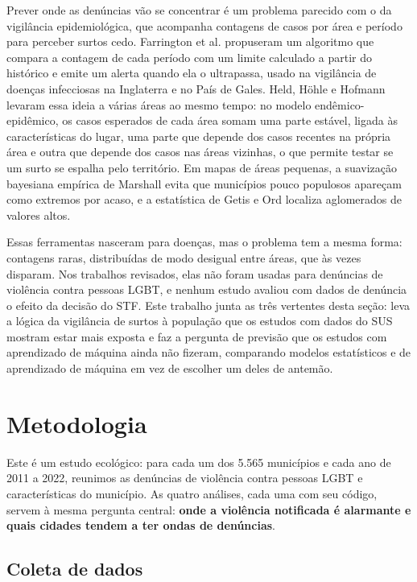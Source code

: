\documentclass[12pt]{article}
\begin{document}
Prever onde as denúncias vão se concentrar é um problema parecido com o da vigilância epidemiológica, que acompanha contagens de casos por área e período para perceber surtos cedo. Farrington et al. \cite{farrington:1996} propuseram um algoritmo que compara a contagem de cada período com um limite calculado a partir do histórico e emite um alerta quando ela o ultrapassa, usado na vigilância de doenças infecciosas na Inglaterra e no País de Gales. Held, Höhle e Hofmann \cite{held_hohle_hofmann:2005} levaram essa ideia a várias áreas ao mesmo tempo: no modelo endêmico-epidêmico, os casos esperados de cada área somam uma parte estável, ligada às características do lugar, uma parte que depende dos casos recentes na própria área e outra que depende dos casos nas áreas vizinhas, o que permite testar se um surto se espalha pelo território. Em mapas de áreas pequenas, a suavização bayesiana empírica de Marshall \cite{marshall:1991} evita que municípios pouco populosos apareçam como extremos por acaso, e a estatística de Getis e Ord \cite{getis_ord:1992} localiza aglomerados de valores altos.

Essas ferramentas nasceram para doenças, mas o problema tem a mesma forma: contagens raras, distribuídas de modo desigual entre áreas, que às vezes disparam. Nos trabalhos revisados, elas não foram usadas para denúncias de violência contra pessoas LGBT, e nenhum estudo avaliou com dados de denúncia o efeito da decisão do STF. Este trabalho junta as três vertentes desta seção: leva a lógica da vigilância de surtos à população que os estudos com dados do SUS mostram estar mais exposta e faz a pergunta de previsão que os estudos com aprendizado de máquina ainda não fizeram, comparando modelos estatísticos e de aprendizado de máquina em vez de escolher um deles de antemão.


\section{Metodologia}
\label{sec:metodologia}

Este é um estudo ecológico: para cada um dos 5.565 municípios e cada ano de 2011 a 2022, reunimos as denúncias de violência contra pessoas LGBT e características do município. As quatro análises, cada uma com seu código, servem à mesma pergunta central: \textbf{onde a violência notificada é alarmante e quais cidades tendem a ter ondas de denúncias}.

\subsection{Coleta de dados}
\end{document}
